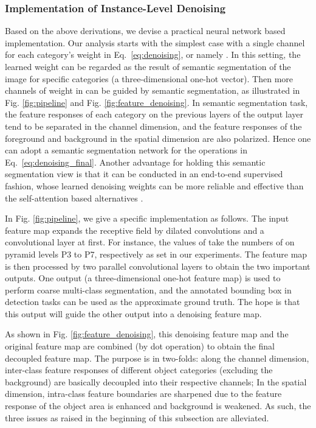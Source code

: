 \documentclass[10pt,journal,compsoc]{IEEEtran}
\begin{document}
\subsubsection{Implementation of Instance-Level Denoising}
\label{sec:inld_implement}
Based on the above derivations, we devise a practical neural network based implementation. Our analysis starts with the simplest case with a single channel for each category's weight  in Eq.~\ref{eq:denoising}, or namely . In this setting, the learned weight  can be regarded as the result of semantic segmentation of the image for specific categories (a three-dimensional one-hot vector). Then more channels of weight  in  can be guided by semantic segmentation, as illustrated in Fig. \ref{fig:pipeline} and Fig. \ref{fig:feature_denoising}. In semantic segmentation task, the feature responses of each category on the previous layers of the output layer tend to be separated in the channel dimension, and the feature responses of the foreground and background in the spatial dimension are also polarized. Hence one can adopt a semantic segmentation network for the operations in Eq.~\ref{eq:denoising_final}. Another advantage for holding this semantic segmentation view is that it can be conducted in an end-to-end supervised fashion, whose learned denoising weights can be more reliable and effective than the self-attention based alternatives \cite{wang2018non,hu2018squeeze}.





In Fig. \ref{fig:pipeline}, we give a specific implementation as follows. The input feature map expands the receptive field by  dilated convolutions \cite{yu2015multi} and a  convolutional layer at first. For instance, the values of  take the numbers of  on pyramid levels P3 to P7, respectively as set in our experiments. The feature map is then processed by two parallel  convolutional layers to obtain the two important outputs. One output (a three-dimensional one-hot feature map) is used to perform coarse multi-class segmentation, and the annotated bounding box in detection tasks can be used as the approximate ground truth. The hope is that this output will guide the other output into a denoising feature map.


As shown in Fig. \ref{fig:feature_denoising}, this denoising feature map and the original feature map are combined (by dot operation) to obtain the final decoupled feature map. The purpose is in two-folds: along the channel dimension, inter-class feature responses of different object categories (excluding the background) are basically decoupled into their respective channels; In the spatial dimension, intra-class feature boundaries are sharpened due to the feature response of the object area is enhanced and background is weakened. As such, the three issues as raised in the beginning of this subsection are alleviated.
\end{document}
